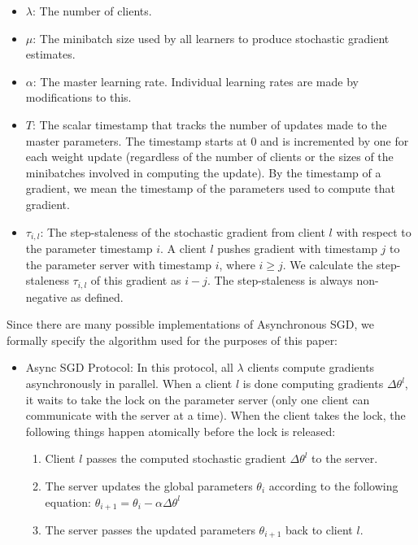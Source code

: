 \documentclass{article} %
\begin{document}
\begin{itemize}
  \item $\lambda$: The number of clients.
  \item $\mu$: The minibatch size used by all learners to produce stochastic gradient estimates.
  \item $\alpha$: The master learning rate. Individual learning rates are made by modifications to this.
  \item $T$: The scalar timestamp that tracks the number of updates made to the master parameters.
    The timestamp starts at 0 and is incremented by one for each weight update (regardless
    of the number of clients or the sizes of the minibatches involved in computing the update). By the timestamp
    of a gradient, we mean the timestamp of the parameters used to compute that gradient.
  \item $\tau_{i,l}$: The step-staleness of the stochastic gradient from client $l$ with respect to the parameter timestamp
    $i$. A client $l$ pushes gradient with timestamp $j$ to the parameter server with timestamp $i$, where $i \geq j$.
    We calculate the step-staleness $\tau_{i,l}$ of this gradient as $i - j$.
    The step-staleness is always non-negative as defined.
\end{itemize}

Since there are many possible implementations of Asynchronous SGD, we formally specify the algorithm used for
the purposes of this paper:

\begin{itemize}
\item Async SGD Protocol: In this protocol, all $\lambda$ clients compute gradients asynchronously in parallel.
  When a client $l$ is done computing gradients $\Delta \theta^l$,
  it waits to take the lock on the parameter server (only one client can communicate with the
  server at a time). When the client takes the lock, the following things happen atomically before the lock is released:
  \begin{enumerate}
    \item Client $l$ passes the computed stochastic gradient $\Delta \theta^l$ to the server.
    \item The server updates the global parameters $\theta_i$ according to the following equation:
      $ \theta_{i + 1} = \theta_{i} - \alpha \Delta \theta^l$
    \item The server passes the updated parameters $\theta_{i + 1}$ back to client $l$. 
  \end{enumerate}

\end{itemize}
\end{document}
